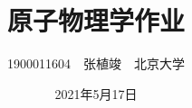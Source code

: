 \documentclass[a4paper,fontset=none]{ctexart}
\begin{document}
\title{\textbf{原子物理学作业}}
\author{1900011604\ \ 张植竣\ \ 北京大学}
\date{2021年5月17日}

\maketitle
\end{document}
